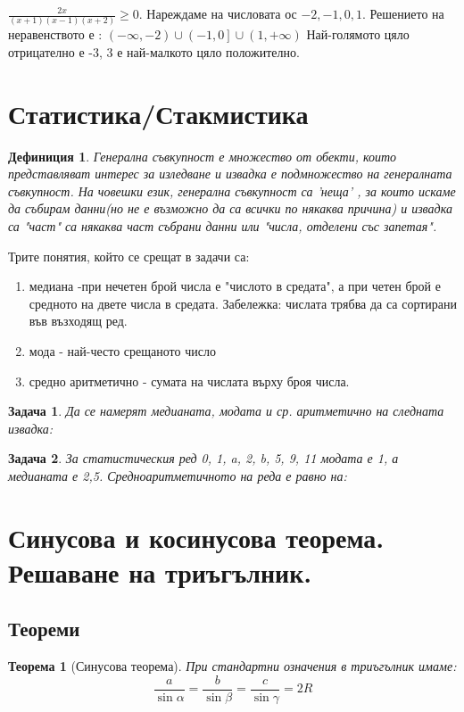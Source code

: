 \documentclass{article}
\newtheorem{definition}{Дефиниция}
\newtheorem{problem}{Задача}
\newtheorem{theorem}{Теорема}
\begin{document}
$\frac{2x}{(x+1)(x-1)(x+2)} \geq 0  $.
Нареждаме на числовата ос $-2,-1,0,1 .$
Решението на неравенството е :
$(-\infty , -2) \cup \left(-1,0 \right] \cup (1,+\infty)$
Най-голямото цяло отрицателно е -3, 3 е най-малкото цяло положително.
\section{Статистика/Стакмистика}
\begin{definition}
	Генерална съвкупност е множество от обекти, които представляват интерес за изледване и извадка е подмножество на генералната съвкупност. На човешки език, генерална съвкупност са 'неща' , за които искаме да събирам данни(но не е възможно да са всички по някаква причина) и извадка са "част" са някаква част събрани данни или "числа, отделени със запетая". 
\end{definition} 

Трите понятия, който се срещат в задачи са:
\begin{enumerate}
	\item медиана -при нечетен брой числа е "числото в средата", а при четен брой е средното на двете числа в средата. Забележка: числата трябва да са сортирани във възходящ ред.
	\item мода - най-често срещаното число
	\item средно аритметично - сумата на числата върху броя числа.
\end{enumerate}

\begin{problem}
	Да се намерят медианата, модата и ср. аритметично на следната извадка:
\end{problem}

\begin{problem}
	За статистическия ред 0, 1, a, 2, b, 5, 9, 11 модата е 1, а медианата е 2,5.
	Средноаритметичното на реда е равно на:
\end{problem}

\section{Синусова и косинусова теорема. Решаване на триъгълник.}
\subsection{Теореми}
\begin{theorem}[Синусова теорема]
	При стандартни означения в триъгълник имаме: 
	$$ \frac{a}{\sin \alpha} = \frac{b}{\sin \beta} = \frac{c}{\sin \gamma} = 2R $$
\end{theorem}
\end{document}
